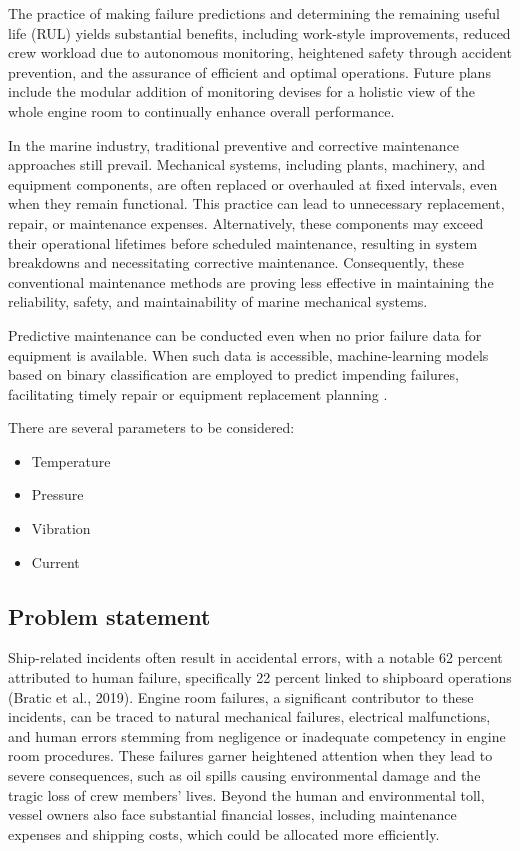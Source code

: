 The practice of making failure predictions and determining the remaining useful life (RUL) yields substantial benefits, including work-style improvements, reduced crew workload due to autonomous monitoring, heightened safety through accident prevention, and the assurance of efficient and optimal operations. Future plans include the modular addition of monitoring devises for a holistic view of the whole engine room to continually enhance overall performance.

In the marine industry, traditional preventive and corrective maintenance approaches still prevail. Mechanical systems, including plants, machinery, and equipment components, are often replaced or overhauled at fixed intervals, even when they remain functional. This practice can lead to unnecessary replacement, repair, or maintenance expenses. Alternatively, these components may exceed their operational lifetimes before scheduled maintenance, resulting in system breakdowns and necessitating corrective maintenance. Consequently, these conventional maintenance methods are proving less effective in maintaining the reliability, safety, and maintainability of marine mechanical systems.

Predictive maintenance can be conducted even when no prior failure data for equipment is available. When such data is accessible, machine-learning models based on binary classification are employed to predict impending failures, facilitating timely repair or equipment replacement planning \cite{han_motor_2019}.

There are several parameters to be considered:
\begin{itemize}
	\item Temperature 
	\item Pressure
	\item Vibration
	\item Current
\end{itemize}

	
\subsection{Problem  statement}
 
Ship-related incidents often result in accidental errors, with a notable 62 percent attributed to human failure, specifically 22 percent linked to shipboard operations (Bratic et al., 2019). Engine room failures, a significant contributor to these incidents, can be traced to natural mechanical failures, electrical malfunctions, and human errors stemming from negligence or inadequate competency in engine room procedures. These failures garner heightened attention when they lead to severe consequences, such as oil spills causing environmental damage and the tragic loss of crew members' lives. Beyond the human and environmental toll, vessel owners also face substantial financial losses, including maintenance expenses and shipping costs, which could be allocated more efficiently.

